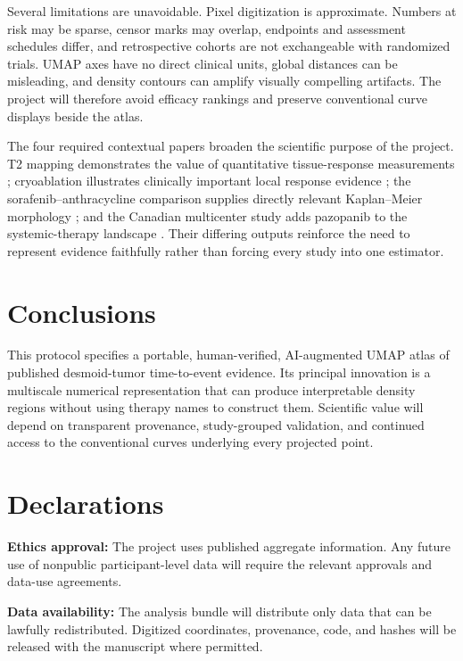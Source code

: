 \documentclass[17pt]{extarticle}
\begin{document}
Several limitations are unavoidable. Pixel digitization is approximate. Numbers at risk may be sparse, censor marks may overlap, endpoints and assessment schedules differ, and retrospective cohorts are not exchangeable with randomized trials. UMAP axes have no direct clinical units, global distances can be misleading, and density contours can amplify visually compelling artifacts. The project will therefore avoid efficacy rankings and preserve conventional curve displays beside the atlas.

The four required contextual papers broaden the scientific purpose of the project. T2 mapping demonstrates the value of quantitative tissue-response measurements \citep{souza2023t2}; cryoablation illustrates clinically important local response evidence \citep{liu2022cryo}; the sorafenib--anthracycline comparison supplies directly relevant Kaplan--Meier morphology \citep{costa2025sorafenib}; and the Canadian multicenter study adds pazopanib to the systemic-therapy landscape \citep{noujaim2024realworld}. Their differing outputs reinforce the need to represent evidence faithfully rather than forcing every study into one estimator.

\section{Conclusions}

This protocol specifies a portable, human-verified, AI-augmented UMAP atlas of published desmoid-tumor time-to-event evidence. Its principal innovation is a multiscale numerical representation that can produce interpretable density regions without using therapy names to construct them. Scientific value will depend on transparent provenance, study-grouped validation, and continued access to the conventional curves underlying every projected point.

\section*{Declarations}

\textbf{Ethics approval:} The project uses published aggregate information. Any future use of nonpublic participant-level data will require the relevant approvals and data-use agreements.

\textbf{Data availability:} The analysis bundle will distribute only data that can be lawfully redistributed. Digitized coordinates, provenance, code, and hashes will be released with the manuscript where permitted.
\end{document}
